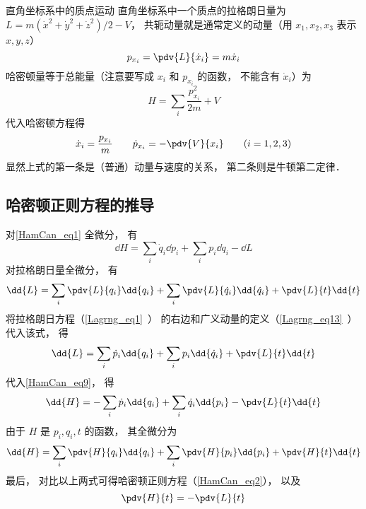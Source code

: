 \begin{example}{直角坐标系中的质点运动}
直角坐标系中一个质点的拉格朗日量为 $L = m(\dot x^2 + \dot y^2 + \dot z^2)/2 - V$， 共轭动量就是通常定义的动量（用 $x_1,x_2,x_3$ 表示 $x, y, z$）
\begin{equation}
p_{x_i} = \pdv{L}{\dot x_i} = m\dot x_i
\end{equation}
哈密顿量等于总能量（注意要写成 $x_i$ 和 $p_{x_i}$ 的函数， 不能含有 $\dot x_i$）为
\begin{equation}
H = \sum_i \frac{p_{x_i}^2}{2m} + V
\end{equation}
代入哈密顿方程得
\begin{equation}
\dot x_i = \frac{p_{x_i}}{m}
\qquad
\dot p_{x_i} = -\pdv{V}{x_i}
\qquad (i = 1,2,3)
\end{equation}
显然上式的第一条是（普通）动量与速度的关系， 第二条则是牛顿第二定律．
\end{example}

\subsection{哈密顿正则方程的推导}
对\autoref{HamCan_eq1} 全微分， 有
\begin{equation}\label{HamCan_eq9}
\dd{H} = \sum_i \dot q_i \dd{p_i} + \sum_i p_i \dd{\dot q_i} - \dd{L}
\end{equation}
对拉格朗日量全微分， 有
\begin{equation}
\dd{L} = \sum_i \pdv{L}{q_i}\dd{q_i} + \sum_i \pdv{L}{\dot q_i}\dd{\dot q_i} + \pdv{L}{t}\dd{t}
\end{equation}
将拉格朗日方程（\autoref{Lagrng_eq1}~） 的右边和广义动量的定义（\autoref{Lagrng_eq13}~） 代入该式， 得
\begin{equation}
\dd{L} = \sum_i \dot p_i\dd{q_i} + \sum_i p_i\dd{\dot q_i} + \pdv{L}{t}\dd{t}
\end{equation}
代入\autoref{HamCan_eq9}， 得
\begin{equation}
\dd{H} = - \sum_i \dot p_i \dd{q_i} + \sum_i \dot q_i \dd{p_i}  - \pdv{L}{t}\dd{t}
\end{equation}
由于 $H$ 是 $p_i, q_i, t$ 的函数， 其全微分为 
\begin{equation}
\dd{H} = \sum_i \pdv{H}{q_i}\dd{q_i} + \sum_i \pdv{H}{p_i}\dd{p_i} + \pdv{H}{t}\dd{t}
\end{equation}
最后， 对比以上两式可得哈密顿正则方程（\autoref{HamCan_eq2}）， 以及
\begin{equation}
\pdv{H}{t} = - \pdv{L}{t}
\end{equation}
